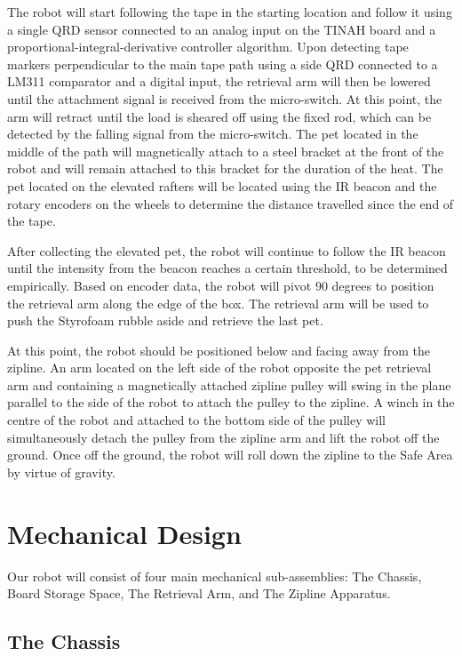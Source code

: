 \documentclass[11pt, oneside]{article} %
\begin{document}
The robot will start following the tape in the starting location and follow it using a single QRD sensor connected to an analog input on the TINAH board and a proportional-integral-derivative controller algorithm. Upon detecting tape markers perpendicular to the main tape path using a side QRD connected to a LM311 comparator and a digital input, the retrieval arm will then be lowered until the attachment signal is received from the micro-switch. At this point, the arm will retract until the load is sheared off using the fixed rod, which can be detected by the falling signal from the micro-switch. The pet located in the middle of the path will magnetically attach to a steel bracket at the front of the robot and will remain attached to this bracket for the duration of the heat. The pet located on the elevated rafters will be located using the IR beacon and the rotary encoders on the wheels to determine the distance travelled since the end of the tape.

After collecting the elevated pet, the robot will continue to follow the IR beacon until the intensity from the beacon reaches a certain threshold, to be determined empirically. Based on encoder data, the robot will pivot 90 degrees to position the retrieval arm along the edge of the box. The retrieval arm will be used to push the Styrofoam rubble aside and retrieve the last pet.

At this point, the robot should be positioned below and facing away from the zipline. An arm located on the left side of the robot opposite the pet retrieval arm and containing a magnetically attached zipline pulley will swing in the plane parallel to the side of the robot to attach the pulley to the zipline. A winch in the centre of the robot and attached to the bottom side of the pulley will simultaneously detach the pulley from the zipline arm and lift the robot off the ground. Once off the ground, the robot will roll down the zipline to the Safe Area by virtue of gravity.

\section{Mechanical Design}

Our robot will consist of four main mechanical sub-assemblies: The Chassis, Board Storage Space, The Retrieval Arm, and The Zipline Apparatus.

	\subsection{The Chassis}
\end{document}
